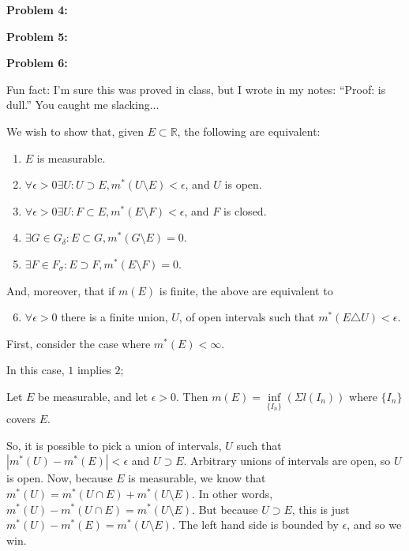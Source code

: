 \documentclass[a4paper,12pt]{article}
\newcommand{\tab}{\hspace{4mm}} %
\newcommand{\shunt}{\vspace{20mm}}
\newcommand{\absval}[1]{\left\lvert #1 \right\rvert}
\newcommand{\de}{\delta}
\newcommand{\ep}{\epsilon}
\newcommand{\si}{\sigma}
\newcommand{\R}{\mathbb{R}}
\begin{document}
\shunt

{\bf Problem 4:}

\shunt

{\bf Problem 5:}


\shunt

{\bf Problem 6:} %

Fun fact: I'm sure this was proved in class, but I wrote in my notes: ``Proof: is dull.'' You caught me slacking...

We wish to show that, given $E \subset \R$, the following are equivalent:

\begin{enumerate}
\item $E$ is measurable.
\item $\forall \ep >0 \exists U: U \supset E, m^*(U \setminus E) < \ep$, and $U$ is open.
\item $\forall \ep >0 \exists U: F \subset E, m^*(E \setminus F) < \ep$, and $F$ is closed.
\item $\exists G \in G_\de : E \subset G, m^*(G \setminus E) = 0$.
\item $\exists F \in F_\si : E \supset F, m^*(E \setminus F) = 0$.
\end{enumerate}

And, moreover, that if $m(E)$ is finite, the above are equivalent to

\begin{enumerate}
\setcounter{enumi}{5}
\item $\forall \ep >0$ there is a finite union, $U$, of open intervals such that $m^*(E \triangle U) < \ep$.
\end{enumerate}

First, consider the case where $m^*(E) < \infty$.

In this case, $1$ implies $2$;

\tab Let $E$ be measurable, and let $\ep >0$. Then $m(E) = \inf\limits_{\{I_n\}}(\Sigma l(I_n))$ where $\{I_n\}$ covers $E$.

\tab So, it is possible to pick a union of intervals, $U$ such that $\absval{m^*(U) - m^*(E)} < \ep$ and $U \supset E$. Arbitrary unions of intervals are open, so $U$ is open. Now, because $E$ is measurable, we know that $m^*(U) = m^*(U \cap E) + m^*(U \setminus E)$. In other words, $m^*(U) - m^*(U \cap E) = m^*(U \setminus E)$. But because $U \supset E$, this is just $m^*(U) - m^*(E) = m^*(U \setminus E)$.  The left hand side is bounded by $\ep$, and so we win.
\end{document}
